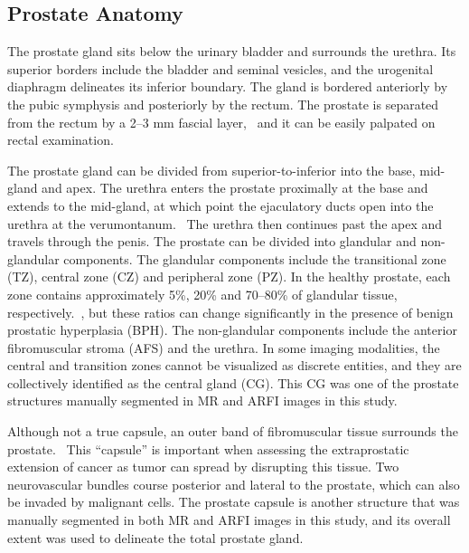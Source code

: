 ﻿\subsection{Prostate Anatomy}
The prostate gland sits below the urinary bladder and surrounds the urethra.
Its superior borders include the bladder and seminal vesicles, and the
urogenital diaphragm delineates its inferior boundary. The gland is bordered
anteriorly by the pubic symphysis and posteriorly by the rectum.  The prostate
is separated from the rectum by a 2--3 mm fascial layer,~\cite{Jung2012} and it
can be easily palpated on rectal examination. 

The prostate gland can be divided from superior-to-inferior into the base,
mid-gland and apex. The urethra enters the prostate proximally at the base and
extends to the mid-gland, at which point the ejaculatory ducts open into the
urethra at the verumontanum.~\cite{Jung2012} The urethra then continues past
the apex and travels through the penis. The prostate can be divided into
glandular and non-glandular components.  The glandular components include the
transitional zone (TZ), central zone (CZ) and peripheral zone (PZ). In the
healthy prostate, each zone contains approximately 5\%, 20\% and 70--80\% of
glandular tissue, respectively.~\cite{Bonekamp2011}, but these ratios can
change significantly in the presence of benign prostatic hyperplasia (BPH). The
non-glandular components include the anterior fibromuscular stroma (AFS) and
the urethra.  In some imaging modalities, the central and transition zones
cannot be visualized as discrete entities, and they are collectively identified
as the central gland (CG).  This CG was one of the prostate structures manually
segmented in MR and ARFI images in this study.

Although not a true capsule, an outer band of fibromuscular tissue surrounds
the prostate.~\cite{Bonekamp2011} This ``capsule'' is important when assessing
the extraprostatic extension of cancer as tumor can spread by disrupting this
tissue. Two neurovascular bundles course posterior and lateral to the prostate,
which can also be invaded by malignant cells.  The prostate capsule is another
structure that was manually segmented in both MR and ARFI images in this study,
and its overall extent was used to delineate the total prostate gland.

